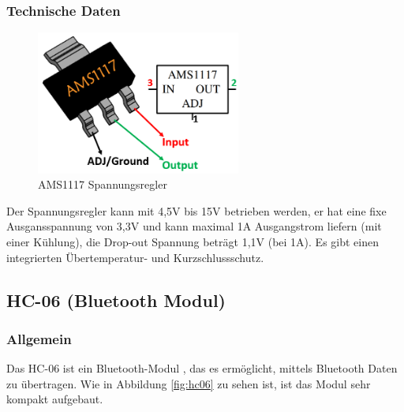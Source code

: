 \subsubsection{Technische Daten}
\begin{figure}[H]
    \centering
    \includegraphics[width=0.6\textwidth]{img/Hardware/AMS1117.png}
    \caption{AMS1117 Spannungsregler}
    \label{fig:ams1117}
\end{figure}
Der Spannungsregler kann mit 4,5V bis 15V betrieben werden,
er hat eine fixe Ausgansspannung von 3,3V und kann maximal 1A Ausgangstrom liefern (mit einer Kühlung),
die Drop-out Spannung beträgt 1,1V (bei 1A).
%
Es gibt einen integrierten Übertemperatur- und Kurzschlussschutz.
%
\subsection{HC-06 (Bluetooth Modul)}
%
\subsubsection{Allgemein}
Das HC-06 ist ein Bluetooth-Modul \cite{hc06-datasheet},
das es ermöglicht,
mittels Bluetooth Daten zu übertragen.
%
Wie in Abbildung \ref{fig:hc06} zu sehen ist,
ist das Modul sehr kompakt aufgebaut.
